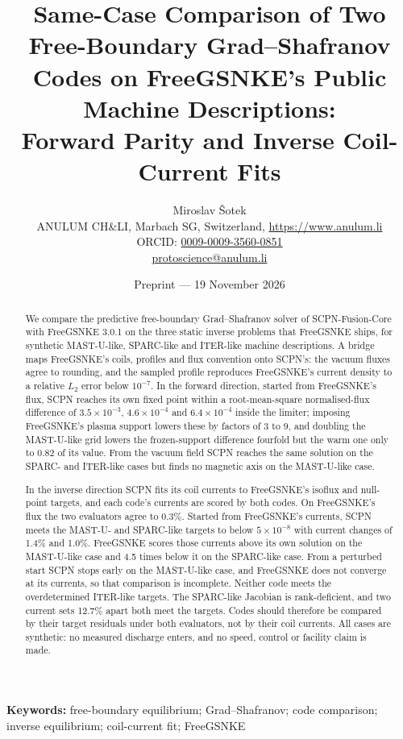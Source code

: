 \documentclass[11pt]{article}
\title{Same-Case Comparison of Two Free-Boundary Grad--Shafranov Codes on
FreeGSNKE's Public Machine Descriptions:\\
Forward Parity and Inverse Coil-Current Fits}
\author{Miroslav \v{S}otek\\
\small ANULUM CH\&LI, Marbach SG, Switzerland, \url{https://www.anulum.li}\\
\small ORCID: \href{https://orcid.org/0009-0009-3560-0851}{0009-0009-3560-0851}\\
\small \href{mailto:protoscience@anulum.li}{protoscience@anulum.li}}
\date{Preprint --- 19 November 2026}
\begin{document}
\maketitle

\begin{abstract}
We compare the predictive free-boundary Grad--Shafranov solver of
SCPN-Fusion-Core with FreeGSNKE 3.0.1 on the three static inverse problems that
FreeGSNKE ships, for synthetic MAST-U-like, SPARC-like and ITER-like machine
descriptions.  A bridge maps FreeGSNKE's coils, profiles and flux convention
onto SCPN's: the vacuum fluxes agree to rounding, and the sampled profile
reproduces FreeGSNKE's current density to a relative $L_2$ error below
$10^{-7}$.  In the forward direction, started from FreeGSNKE's flux, SCPN reaches
its own fixed point within a root-mean-square normalised-flux difference of
$3.5 \times 10^{-3}$, $4.6 \times 10^{-4}$ and $6.4 \times 10^{-4}$ inside the
limiter; imposing FreeGSNKE's plasma support lowers these by factors of 3 to 9, and
doubling the MAST-U-like grid lowers the frozen-support difference fourfold
but the warm one only to 0.82 of its value.
From the vacuum field SCPN reaches the same solution on the SPARC- and ITER-like
cases but finds no magnetic axis on the MAST-U-like case.

In the inverse direction SCPN fits its coil currents to FreeGSNKE's isoflux and
null-point targets, and each code's currents are scored by both codes.  On
FreeGSNKE's flux the two evaluators agree to 0.3\%.  Started from FreeGSNKE's
currents, SCPN meets the MAST-U- and SPARC-like targets to below $5 \times 10^{-8}$ with current changes of 1.4\% and
1.0\%.  FreeGSNKE scores those currents above its own solution on the
MAST-U-like case and 4.5 times below it on the SPARC-like case.  From a
perturbed start SCPN stops early on the MAST-U-like case, and FreeGSNKE does
not converge at its currents, so that comparison is incomplete.  Neither code
meets the overdetermined ITER-like targets.  The SPARC-like Jacobian is
rank-deficient, and two current sets 12.7\% apart both meet the targets.  Codes
should therefore be compared by their target residuals under both evaluators,
not by their coil currents.  All cases are synthetic: no measured discharge
enters, and no speed, control or facility claim is made.
\end{abstract}

\noindent\textbf{Keywords:} free-boundary equilibrium; Grad--Shafranov;
code comparison; inverse equilibrium; coil-current fit; FreeGSNKE
\end{document}

